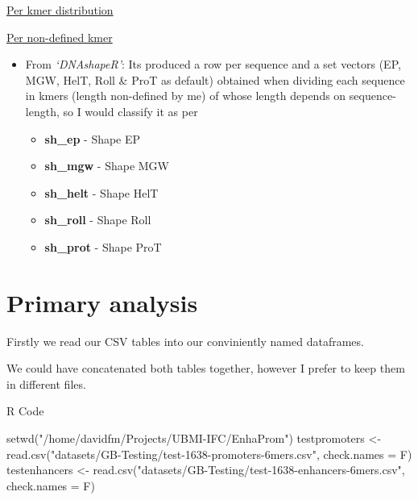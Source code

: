 \documentclass[
  letterpaper,
  DIV=11,
  numbers=noendperiod]{scrartcl}
\newenvironment{Shaded}{\begin{snugshade}}{\end{snugshade}}
\newcommand{\AttributeTok}[1]{\textcolor[rgb]{0.40,0.45,0.13}{#1}}
\newcommand{\FunctionTok}[1]{\textcolor[rgb]{0.28,0.35,0.67}{#1}}
\newcommand{\NormalTok}[1]{\textcolor[rgb]{0.00,0.23,0.31}{#1}}
\newcommand{\OtherTok}[1]{\textcolor[rgb]{0.00,0.23,0.31}{#1}}
\newcommand{\StringTok}[1]{\textcolor[rgb]{0.13,0.47,0.30}{#1}}
\begin{document}
\underline{Per kmer distribution}

\underline{Per non-defined kmer}

\begin{itemize}
\item
  From \emph{`DNAshapeR'}: \newline Its produced a row per sequence and
  a set vectors (EP, MGW, HelT, Roll \& ProT as default) obtained when
  dividing each sequence in kmers (length non-defined by me) of whose
  length depends on sequence-length, so I would classify it as per

  \begin{itemize}
  \item
    \color{red}\textbf{sh\_ep} \color{black} - Shape EP
  \item
    \color{red}\textbf{sh\_mgw} \color{black} - Shape MGW
  \item
    \color{red}\textbf{sh\_helt} \color{black} - Shape HelT
  \item
    \color{red}\textbf{sh\_roll} \color{black} - Shape Roll
  \item
    \color{red}\textbf{sh\_prot} \color{black} - Shape ProT
  \end{itemize}
\end{itemize}

\section{Primary analysis}\label{primary-analysis}

Firstly we read our CSV tables into our conviniently named dataframes.

We could have concatenated both tables together, however I prefer to
keep them in different files.

\begin{rheader}
R Code
\end{rheader}

\begin{Shaded}
\begin{Highlighting}[]
\FunctionTok{setwd}\NormalTok{(}\StringTok{"/home/davidfm/Projects/UBMI{-}IFC/EnhaProm"}\NormalTok{)}
\NormalTok{testpromoters }\OtherTok{\textless{}{-}} \FunctionTok{read.csv}\NormalTok{(}\StringTok{"datasets/GB{-}Testing/test{-}1638{-}promoters{-}6mers.csv"}\NormalTok{, }
                          \AttributeTok{check.names =}\NormalTok{ F)}
\NormalTok{testenhancers }\OtherTok{\textless{}{-}} \FunctionTok{read.csv}\NormalTok{(}\StringTok{"datasets/GB{-}Testing/test{-}1638{-}enhancers{-}6mers.csv"}\NormalTok{, }
                          \AttributeTok{check.names =}\NormalTok{ F)}
\end{Highlighting}
\end{Shaded}
\end{document}
